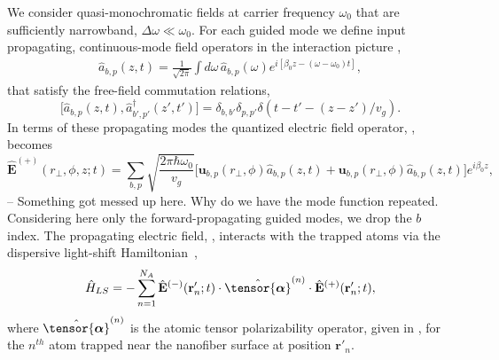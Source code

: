 \documentclass[preprint, aps,pra,onecolumn]{revtex4-1} %
\newcommand{\poltens}{\hat{\tensor{\boldsymbol{\alpha}}}}
\begin{document}
We consider quasi-monochromatic fields at carrier frequency $\omega_0$ that are sufficiently narrowband, $\Delta \omega \ll \omega_0$. 
For each guided mode we define input propagating, continuous-mode field operators in the interaction picture \cite{gardiner_input_1985, blow_continuum_1990, le_kien_correlations_2008},
	\begin{align}
		\hat{a}_{b,p}(z,t) =\frac{1}{\sqrt{2 \pi}}  \int d \omega \, \hat{a}_{b,p}(\omega) e^{i[ \beta_0 z- (\omega-\omega_0) t ]}, 
	\end{align}
that satisfy the free-field commutation relations,
	\begin{equation} \label{Eq::InputOutputCommutation}
		\big[\hat{a}_{b,p}(z,t),\hat{a}^\dag_{b',p'}(z',t')\big]=\delta_{b,b'}\delta_{p,p'}  \delta(t-t'-(z-z')/v_g).
	\end{equation}
In terms of these propagating modes the quantized electric field operator, , becomes
	\begin{equation} \label{Eq::PropagatingElectricField}
		\hat{\mathbf{E}}^{(+)}(r\!_\perp,\phi,z;t) = \sum_{b,p} \sqrt{ \frac{2 \pi \hbar \omega_0}{ v_g} } \big[ \mathbf{u}_{b,p}(r\!_\perp,\phi) \hat{a}_{b,p}(z,t) + \mathbf{u}_{b,p}(r\!_\perp,\phi) \hat{a}_{b,p}(z,t) \big] e^{i \beta_0 z},
	\end{equation}	
{\color{red} -- Something got messed up here.  Why do we have the mode function repeated.}  Considering here only the forward-propagating guided modes, we  drop the $b$ index.  
The propagating electric field, , interacts with the trapped atoms via the dispersive light-shift Hamiltonian~\cite{deutsch_quantum_2010,kien_dynamical_2013,baragiola_open_2014},
	\begin{equation} \label{Eq::LightShiftHam}
		\hat{H}_{LS} = - \sum_{n=1}^{N_A} \hat{\mathbf{E}}^{(-)}(\mathbf{r}'_n ; t ) \cdot \poltens^{(n)} \cdot \hat{\mathbf{E}}^{(+)}(\mathbf{r}'_n ;t ),
	\end{equation}
where $\poltens^{(n)}$ is the atomic tensor polarizability operator, given in , for the $n^{th}$ atom trapped near the nanofiber surface at position $\mathbf{r}'_n$.   
\end{document}
